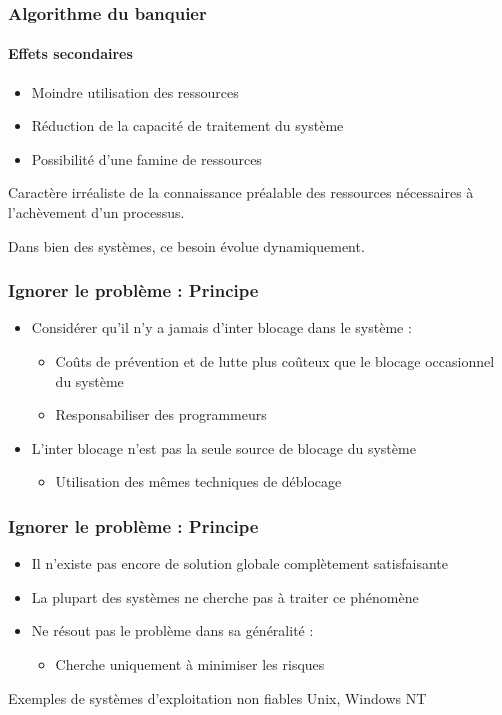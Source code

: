 \begin{frame}
\frametitle{Algorithme du banquier}
\framesubtitle{Effets secondaires}
\begin{itemize}
\item Moindre utilisation des ressources
\item Réduction de la capacité de traitement du système
\item Possibilité d’une famine de ressources
\end{itemize}

Caractère irréaliste de la connaissance préalable des ressources nécessaires à l'achèvement d'un processus.

Dans bien des systèmes, ce besoin évolue dynamiquement.
\end{frame}

\begin{frame}
\frametitle{Ignorer le problème : Principe}
\begin{itemize}
\item Considérer qu’il n’y a jamais d’inter blocage dans le système :
\begin{itemize}
\item Coûts de prévention et de lutte plus coûteux que le blocage occasionnel du système
\item Responsabiliser des programmeurs
\end{itemize}
\item L’inter blocage n’est pas la seule source de blocage du système
\begin{itemize}
\item Utilisation des mêmes techniques de déblocage
\end{itemize}
\end{itemize}
\end{frame}

\begin{frame}
\frametitle{Ignorer le problème : Principe}
\begin{itemize}
\item Il n’existe pas encore de solution globale complètement satisfaisante
\item La plupart des systèmes ne cherche pas à traiter ce phénomène
\item Ne résout pas le problème dans sa généralité :
\begin{itemize}
\item Cherche uniquement à minimiser les risques
\end{itemize}
\end{itemize}
\begin{exampleblock}{Exemples de systèmes d'exploitation non fiables}
Unix, Windows NT
\end{exampleblock}

\end{frame}


